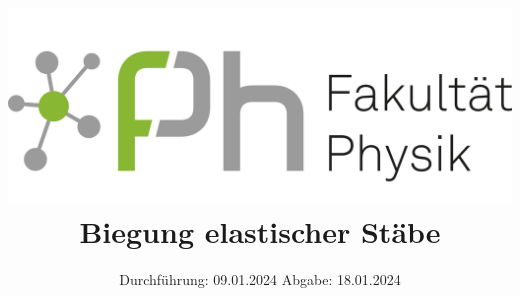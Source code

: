 

\subject{V103}
\title{\includegraphics[scale=0.1]{../Logo.png}\\
Biegung elastischer Stäbe}
\date{%
  Durchführung: 09.01.2024
  \hspace{3em}
  Abgabe: 18.01.2024
}



\maketitle
\thispagestyle{empty}
\tableofcontents
\newpage






\printbibliography{}


